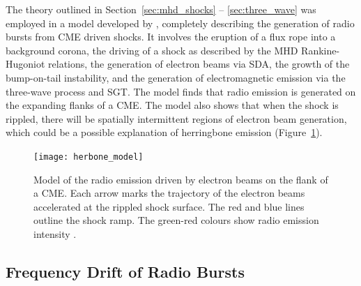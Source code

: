 The theory outlined in Section~\ref{sec:mhd_shocks} -- \ref{sec:three_wave} was employed in a model developed by \citet{schmidt2012b}, completely describing the generation of radio bursts from CME driven shocks. It involves the eruption of a flux rope into a background corona, the driving of a shock as described by the MHD Rankine-Hugoniot relations, the generation of electron beams via SDA, the growth of the bump-on-tail instability, and the generation of electromagnetic emission via the three-wave process and SGT. The model finds that radio emission is generated on the expanding flanks of a CME. The model also shows that when the shock is rippled, there will be spatially intermittent regions of electron beam generation, which could be a possible explanation of herringbone emission (Figure~\ref{fig:herbone_model}).
\begin{figure}[t!]
\begin{center}
\texttt{[image: herbone\_model]}
\caption[Model of radio burst driven by expanding CME flanks]{Model of the radio emission driven by electron beams on the flank of a CME. Each arrow marks the trajectory of the electron beams accelerated at the rippled shock surface. The red and blue lines outline the shock ramp. The green-red colours show radio emission intensity \citet{schmidt2012b}.}
\label{fig:herbone_model}
\end{center}
\end{figure}


\subsection{Frequency Drift of Radio Bursts}\label{sec:freq_drift}

